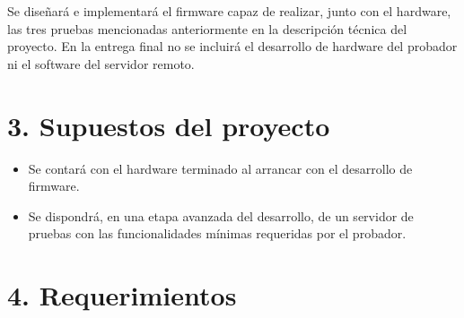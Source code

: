 \documentclass[11pt]{charter}
\begin{document}
Se diseñará e implementará el firmware capaz de realizar, junto con el hardware, las tres pruebas mencionadas anteriormente en la descripción técnica del proyecto. 
En la entrega final no se incluirá el desarrollo de hardware del probador ni el software del servidor remoto.

\section{3. Supuestos del proyecto}
\label{sec:supuestos}

\begin{itemize}
\item Se contará con el hardware terminado al arrancar con el desarrollo de firmware.
\item Se dispondrá, en una etapa avanzada del desarrollo, de un servidor de pruebas con las funcionalidades mínimas requeridas por el probador.
\end{itemize}

\section{4. Requerimientos}
\label{sec:requerimientos}
\end{document}
